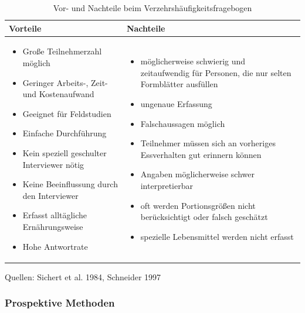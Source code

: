 \begin{table}[!h]
\begin{flushleft}
\caption{Vor- und Nachteile beim Verzehrshäufigkeitsfragebogen}
\end{flushleft}
\begin{tabular}{p{7cm} p{7cm}}
Vorteile & Nachteile \\
\hline

\begin{itemize}
\item Große Teilnehmerzahl möglich
\item Geringer Arbeits-, Zeit- und Kostenaufwand
\item Geeignet für Feldstudien
\item Einfache Durchführung
\item Kein speziell geschulter Interviewer nötig
\item Keine Beeinflussung durch den Interviewer
\item Erfasst alltägliche Ernährungsweise
\item Hohe Antwortrate


\end{itemize}

&

\begin{itemize}
\item möglicherweise schwierig und zeitaufwendig für Personen, die nur selten Formblätter ausfüllen
\item ungenaue Erfassung
\item Falschaussagen möglich
\item Teilnehmer müssen sich an vorheriges Essverhalten gut erinnern können
\item Angaben möglicherweise schwer interpretierbar
\item oft werden Portionsgrößen nicht berücksichtigt oder falsch geschätzt
\item spezielle Lebensmittel werden nicht erfasst


\end{itemize}
\end{tabular}
\label{tab:Verzehrshäufigkeitsfragebogen}
\end{table}

Quellen: Sichert et al. 1984, Schneider 1997


\subsubsection{Prospektive Methoden}

